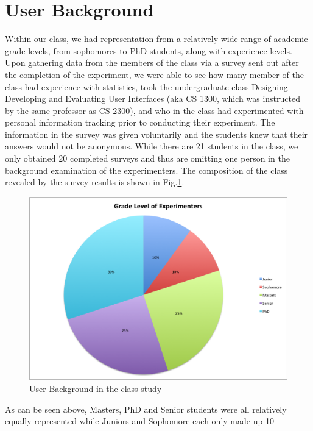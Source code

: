 \section{User Background}
Within our class, we had representation from a relatively wide range of academic grade levels, from sophomores to PhD students, along with experience levels.  Upon gathering data from the members of the class via a survey sent out after the completion of the experiment, we were able to see how many member of the class had experience with statistics, took the undergraduate class Designing Developing and Evaluating User Interfaces (aka CS 1300, which was instructed by the same professor as CS 2300), and who in the class had experimented with personal information tracking prior to conducting their experiment.  The information in the survey was given voluntarily and the students knew that their answers would not be anonymous.  While there are 21 students in the class, we only obtained 20 completed surveys and thus are omitting one person in the background examination of the experimenters. The composition of the class revealed by the survey results is shown in Fig.\ref{fig:surveybc}.  

\begin{figure}[!t]\centering
\includegraphics[width=1.0\columnwidth]{images/Grade_Level_of_Experimenters.png}
\caption{\footnotesize User Background in the class study \label{fig:surveybc} 
}%
\end{figure}

As can be seen above,  Masters, PhD and Senior students were all relatively equally represented while Juniors and Sophomore each only made up 10%

